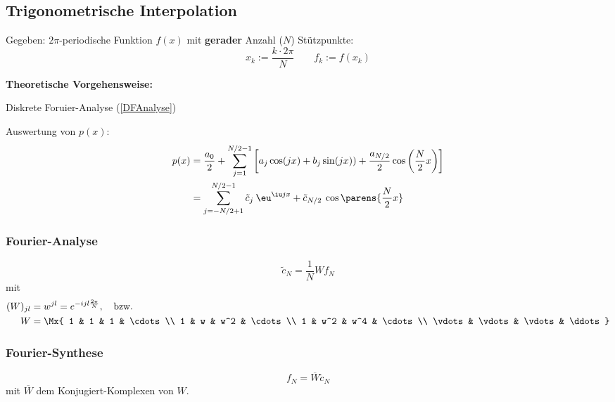 	\subsection{Trigonometrische Interpolation}
		Gegeben: $2\pi$-periodische Funktion $f(x)$ mit \textbf{gerader} Anzahl ($N$) Stützpunkte:
		\[
			x_k:=\frac{k\cdot 2\pi}{N} \qquad f_k:= f(x_k)
		\]

		\textbf{Theoretische Vorgehensweise:}
		\begin{tightenumerate}
			\item Diskrete Foruier-Analyse (\ref{DFAnalyse})
			\item Auswertung von $p(x)$:
				\begin{align*}
					p(x) &= \frac{a_0}{2} + \sum_{j=1}^{N/2-1}\left[a_j\cos(jx) + b_j \sin(jx)) + \frac{a_{N/2}}{2}\cos\left(\frac{N}{2}x\right) \right] \\
					     &= \sum_{j=-N/2+1}^{N/2-1} \tilde c_j \: \eu^{\iu j x} + \tilde c_{N/2} \: \cos \parens{\frac N 2 x}
				\end{align*}
		\end{tightenumerate}

		\subsubsection{Fourier-Analyse}
			\begin{equation}
				\tilde c_N = \frac{1}{N}Wf_N \label{DFAnalyse}
			\end{equation}
			mit
			\begin{align*}
				(W)_{jl} &= w^{jl} = e^{-ijl\frac{2\pi}{N}}, \quad \text{bzw.} \\
				W &= \Mx{
					1 & 1 & 1 & \cdots \\
					1 & w & w^2 & \cdots \\
					1 & w^2 & w^4 & \cdots \\
					\vdots & \vdots & \vdots & \ddots
				}
			\end{align*}

		\subsubsection{Fourier-Synthese}
			\[
				f_N = \overline{W}\tilde c_N
			\]
			mit $\overline{W}$ dem Konjugiert-Komplexen von $W$.

